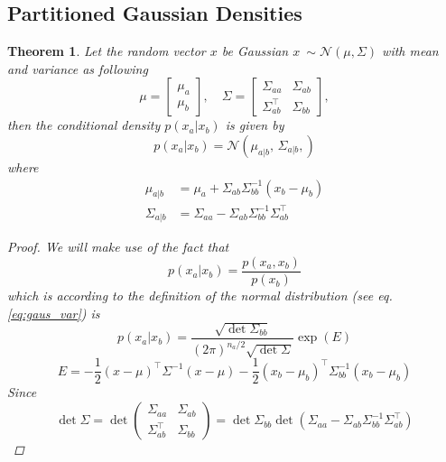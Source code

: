 \documentclass{article}[12pt]
\newtheorem{theorem}{Theorem}
\begin{document}
\subsection{Partitioned Gaussian Densities}\label{firstappendix}
\begin{theorem}\cite{schon2011manipulating}
	Let the random vector $x$ be Gaussian $x~\sim\mathcal{N}(\mu,\Sigma)$ with mean and variance as following
	\begin{equation}
	\mu = \begin{bmatrix}
	\mu_a\\ \mu_b
	\end{bmatrix},
	\quad
	\Sigma = \begin{bmatrix}
	\Sigma_{aa} & \Sigma_{ab} \\
	\Sigma_{ab}^\top & \Sigma_{bb}
	\end{bmatrix},
	\end{equation}
	then the conditional density $p(x_a | x_b)$ is given by 
	\begin{equation}
	p(x_a|x_b) = \mathcal{N}(\mu_{a|b},\, \Sigma_{a|b},)
	\end{equation}
	where 
	\begin{align}
	\mu_{a|b}&=\mu_a + \Sigma_{ab} \Sigma_{bb}^{-1} (x_b - \mu_b) \\
	\Sigma_{a|b} &=\Sigma_{aa} - 
	\Sigma_{ab} \Sigma_{bb}^{-1}\Sigma_{ab}^\top
	\end{align}
	\begin{proof}
		We will make use of the fact that 
		\begin{equation}
		p(x_a | x_b) = \frac{p(x_a,x_b)}{p(x_b)}
		\end{equation}
		which is according to the definition of the normal distribution (see eq.\eqref{eq:gaus_var}) is
		\begin{equation}
		\label{eq:p}
		p(x_a|x_b) = \frac{\sqrt{\det\Sigma_{bb}}}{(2\pi)^{n_a/2} \sqrt{\det \Sigma}} \exp(E)
		\end{equation}
		\begin{equation}
		\label{eq:e}
		E = -\frac{1}{2}(x-\mu)^{\top} \Sigma^{-1} (x-\mu) -
		\frac{1}{2}(x_b-\mu_b)^{\top} \Sigma_{bb}^{-1} (x_b-\mu_b)
		\end{equation}
		Since 
		\begin{equation}
		\det\Sigma = \det \begin{pmatrix}
		\Sigma_{aa} & \Sigma_{ab}\\ \Sigma_{ab}^\top & \Sigma_{bb}
		\end{pmatrix} = 
		\det \Sigma_{bb} \det (\Sigma_{aa}- \Sigma_{ab}\Sigma_{bb}^{-1} \Sigma_{ab}^\top)

\end{equation}
\end{proof}
\end{theorem}
\end{document}
